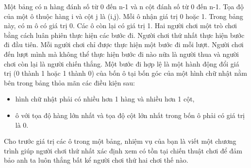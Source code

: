 Một bảng có n hàng đánh số từ 0 đến n-1 và n cột đánh số từ 0 đến n-1. Tọa độ của một ô thuộc hàng i và cột  j là (i,j). Mỗi ô nhận giá trị 0 hoặc 1. Trong bảng này, có m ô có giá trị 0. Các ô còn lại có giá trị 1. Hai người chơi một trò chơi bằng cách luân phiên thực hiện các bước đi. Người chơi thứ nhất thực hiện bước đi đầu tiên. Mỗi người chơi chỉ được thực hiện một bước đi mỗi lượt. Người chơi đến lượt mình mà không thể thực hiện bước đi nào nữa là người thua và người chơi còn lại là người chiến thắng. Một bước đi hợp lệ là một hành động đổi giá trị (0 thành 1 hoặc 1 thành 0) của bốn ô tại bốn góc của một hình chữ nhật nằm bên trong bảng thỏa mãn các điều kiện sau:  
\begin{itemize}
	\item     hình chữ nhật phải có nhiều hơn 1 hàng và nhiều hơn 1 cột,   
	\item     ô với tọa độ hàng lớn nhất và tọa độ cột lớn nhất trong bốn ô phải có giá trị là 0.   
\end{itemize}

   Cho trước giá trị các ô trong một bảng, nhiệm vụ của bạn là viết một chương trình giúp người chơi thứ nhất xác định xem có tồn tại chiến thuật chơi để đảm bảo anh ta luôn thắng bất kể người chơi thứ hai chơi thế nào.  

\